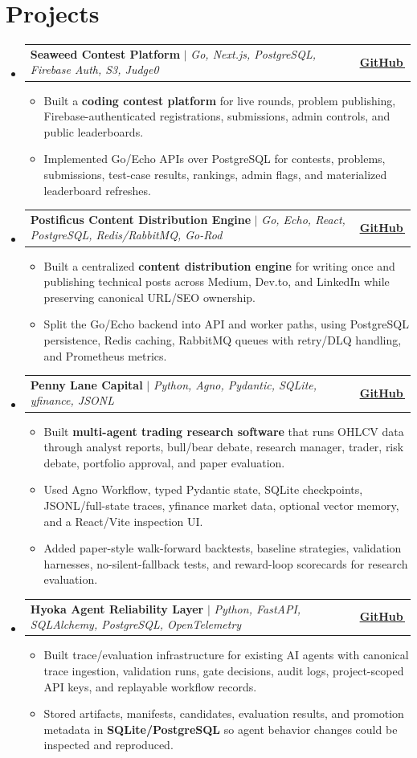 \documentclass[letterpaper,11pt]{article}
\makeatletter
\newcommand{\bodyhref}[2]{\href{#1}{\underline{#2}\,\faExternalLink*}}
\newcommand{\resumeItem}[1]{\item{\fontsize{8.82pt}{9.28pt}\selectfont #1\vspace{-0.7pt}}}
\newcommand{\resumeProjectHeading}[2]{
    \item
    \begin{tabular*}{1.0\textwidth}{l@{\extracolsep{\fill}}r}
      \small#1 & \textbf{\small #2}\\
    \end{tabular*}\vspace{-4pt}
}
\newcommand{\resumeSubHeadingListStart}{\begin{itemize}[leftmargin=0.0in, label={}, itemsep=0.6pt, topsep=0pt, parsep=0pt, partopsep=0pt]}
\newcommand{\resumeSubHeadingListEnd}{\end{itemize}}
\newcommand{\resumeItemListStart}{\begin{itemize}[leftmargin=0.16in,itemsep=0.3pt,topsep=0.9pt,parsep=0pt,partopsep=0pt]}
\newcommand{\resumeItemListEnd}{\end{itemize}\vspace{-3pt}}
\makeatother
\begin{document}
\section{Projects}
\resumeSubHeadingListStart
\resumeProjectHeading
{\textbf{Seaweed Contest Platform} $|$ \emph{Go, Next.js, PostgreSQL, Firebase Auth, S3, Judge0}}{\bodyhref{https://github.com/unichronic/seaweed-fe}{GitHub}}
\resumeItemListStart
\resumeItem{Built a \textbf{coding contest platform} for live rounds, problem publishing, Firebase-authenticated registrations, submissions, admin controls, and public leaderboards.}
\resumeItem{Implemented Go/Echo APIs over PostgreSQL for contests, problems, submissions, test-case results, rankings, admin flags, and materialized leaderboard refreshes.}
\resumeItemListEnd
\resumeProjectHeading
{\textbf{Postificus Content Distribution Engine} $|$ \emph{Go, Echo, React, PostgreSQL, Redis/RabbitMQ, Go-Rod}}{\bodyhref{https://github.com/unichronic/postificus}{GitHub}}
\resumeItemListStart
\resumeItem{Built a centralized \textbf{content distribution engine} for writing once and publishing technical posts across Medium, Dev.to, and LinkedIn while preserving canonical URL/SEO ownership.}
\resumeItem{Split the Go/Echo backend into API and worker paths, using PostgreSQL persistence, Redis caching, RabbitMQ queues with retry/DLQ handling, and Prometheus metrics.}
\resumeItemListEnd
\resumeProjectHeading
{\textbf{Penny Lane Capital} $|$ \emph{Python, Agno, Pydantic, SQLite, yfinance, JSONL}}{\bodyhref{https://github.com/unichronic/pennylane}{GitHub}}
\resumeItemListStart
\resumeItem{Built \textbf{multi-agent trading research software} that runs OHLCV data through analyst reports, bull/bear debate, research manager, trader, risk debate, portfolio approval, and paper evaluation.}
\resumeItem{Used Agno Workflow, typed Pydantic state, SQLite checkpoints, JSONL/full-state traces, yfinance market data, optional vector memory, and a React/Vite inspection UI.}
\resumeItem{Added paper-style walk-forward backtests, baseline strategies, validation harnesses, no-silent-fallback tests, and reward-loop scorecards for research evaluation.}
\resumeItemListEnd
\resumeProjectHeading
{\textbf{Hyoka Agent Reliability Layer} $|$ \emph{Python, FastAPI, SQLAlchemy, PostgreSQL, OpenTelemetry}}{\bodyhref{https://github.com/unichronic/hyoka}{GitHub}}
\resumeItemListStart
\resumeItem{Built trace/evaluation infrastructure for existing AI agents with canonical trace ingestion, validation runs, gate decisions, audit logs, project-scoped API keys, and replayable workflow records.}
\resumeItem{Stored artifacts, manifests, candidates, evaluation results, and promotion metadata in \textbf{SQLite/PostgreSQL} so agent behavior changes could be inspected and reproduced.}
\resumeItemListEnd
\resumeSubHeadingListEnd
\end{document}
